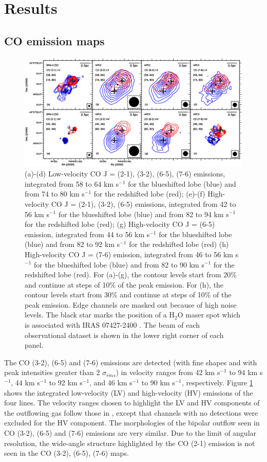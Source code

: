 \section{Results}
\subsection{CO emission maps}

\begin{figure}[htbp]
\includegraphics[scale=.65]{./fig/ori_contourall.eps}
\caption{(a)-(d) Low-velocity CO J = (2-1), (3-2), (6-5), (7-6) emissions, integrated from 58 to 64 km s$^{-1} $ for the blueshifted lobe (blue) and from 74 to 80 km s$^{-1}$ for the redshifted lobe (red); (e)-(f) High-velocity CO J = (2-1), (3-2), (6-5) emissions,  integrated from 42 to 56 km s$^{-1} $ for the blueshifted lobe (blue) and from 82 to 94 km s$^{-1}$ for the redshifted lobe (red); (g) High-velocity CO J = (6-5) emission, integrated from 44 to 56 km s$^{-1} $ for the blueshifted lobe (blue) and from 82 to 92 km s$^{-1}$ for the redshifted lobe (red) (h) High-velocity CO J = (7-6) emission, integrated from 46 to 56 km s$^{-1} $ for the blueshifted lobe (blue) and from 82 to 90 km s$^{-1}$ for the redshifted lobe (red). For (a)-(g), the contour levels start from 20\% and continue at steps of 10\% of the peak emission. For (h), the contour levels start from 30\% and continue at steps of 10\% of the peak emission. Edge channels are masked out because of high noise levels. The black star marks the position of a H$_2$O maser spot which is associated with IRAS 07427-2400 \citep{2015PASJ...67...69S}. The beam of each observational dataset is shown in the lower right corner of each panel. \label{fig:figcontour}}
\end{figure}

The CO (3-2), (6-5) and (7-6) emissions are detected (with fine shapes and with peak intensities greater than 2 $\sigma_{rms}$) in velocity ranges from 42 km s$^{-1}$ to 94 km s$^{-1}$, 44 km s$^{-1}$ to 92 km s$^{-1}$, and 46 km s$^{-1}$ to 90 km s$^{-1}$, respectively. Figure \ref{fig:figcontour} shows the integrated low-velocity (LV) and high-velocity (HV) emissions of the four lines. The velocity ranges chosen to highlight the LV and HV components of the outflowing gas follow those in \citet{2009ApJ...696...66Q}, except that channels with no detections were excluded for the HV component. The morphologies of the bipolar outflow seen in CO (3-2), (6-5) and (7-6) emissions are very similar. Due to the limit of angular resolution, the wide-angle structure highlighted by the CO (2-1) emission is not seen in the CO (3-2), (6-5), (7-6) maps.


